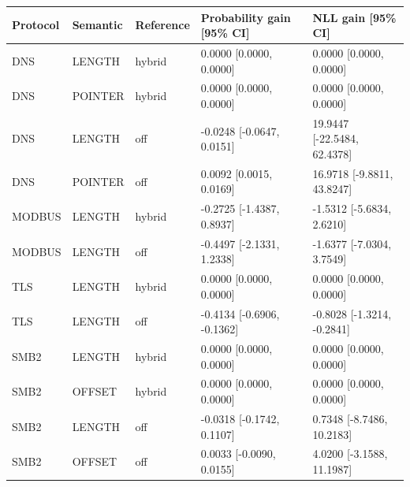 \begin{tabular}{lllll}
\hline
Protocol & Semantic & Reference & Probability gain [95\% CI] & NLL gain [95\% CI] \\
\hline
DNS & LENGTH & hybrid & 0.0000 [0.0000, 0.0000] & 0.0000 [0.0000, 0.0000] \\
DNS & POINTER & hybrid & 0.0000 [0.0000, 0.0000] & 0.0000 [0.0000, 0.0000] \\
DNS & LENGTH & off & -0.0248 [-0.0647, 0.0151] & 19.9447 [-22.5484, 62.4378] \\
DNS & POINTER & off & 0.0092 [0.0015, 0.0169] & 16.9718 [-9.8811, 43.8247] \\
MODBUS & LENGTH & hybrid & -0.2725 [-1.4387, 0.8937] & -1.5312 [-5.6834, 2.6210] \\
MODBUS & LENGTH & off & -0.4497 [-2.1331, 1.2338] & -1.6377 [-7.0304, 3.7549] \\
TLS & LENGTH & hybrid & 0.0000 [0.0000, 0.0000] & 0.0000 [0.0000, 0.0000] \\
TLS & LENGTH & off & -0.4134 [-0.6906, -0.1362] & -0.8028 [-1.3214, -0.2841] \\
SMB2 & LENGTH & hybrid & 0.0000 [0.0000, 0.0000] & 0.0000 [0.0000, 0.0000] \\
SMB2 & OFFSET & hybrid & 0.0000 [0.0000, 0.0000] & 0.0000 [0.0000, 0.0000] \\
SMB2 & LENGTH & off & -0.0318 [-0.1742, 0.1107] & 0.7348 [-8.7486, 10.2183] \\
SMB2 & OFFSET & off & 0.0033 [-0.0090, 0.0155] & 4.0200 [-3.1588, 11.1987] \\
\hline
\end{tabular}

